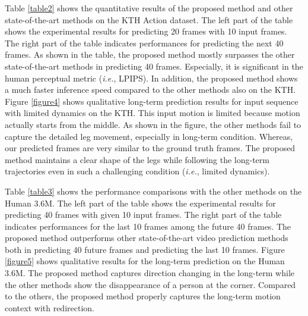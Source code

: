 \documentclass[final]{cvpr}
\begin{document}
Table \ref{table2} shows the quantitative results of the proposed method and other state-of-the-art methods on the KTH Action dataset. The left part of the table shows the experimental results for predicting 20 frames with 10 input frames. The right part of the table indicates performances for predicting the next 40 frames. As shown in the table, the proposed method mostly surpasses the other state-of-the-art methods in predicting 40 frames. Especially, it is significant in the human perceptual metric (\textit{i.e.}, LPIPS). In addition, the proposed method shows a much faster inference speed compared to the other methods also on the KTH. Figure \ref{figure4} shows qualitative long-term prediction results for input sequence with limited dynamics on the KTH. This input motion is limited because motion actually starts from the middle. As shown in the figure, the other methods fail to capture the detailed leg movement, especially in long-term condition. Whereas, our predicted frames are very similar to the ground truth frames. The proposed method maintains a clear shape of the legs while following the long-term trajectories even in such a challenging condition (\textit{i.e.}, limited dynamics). 

Table \ref{table3} shows the performance comparisons with the other methods on the Human 3.6M. The left part of the table shows the experimental results for predicting 40 frames with given 10 input frames. The right part of the table indicates performances for the last 10 frames among the future 40 frames. The proposed method outperforms other state-of-the-art video prediction methods both in predicting 40 future frames and predicting the last 10 frames. Figure \ref{figure5} shows qualitative results for the long-term prediction on the Human 3.6M. The proposed method captures direction changing in the long-term while the other methods show the disappearance of a person at the corner. Compared to the others, the proposed method properly captures the long-term motion context with redirection.
\end{document}
